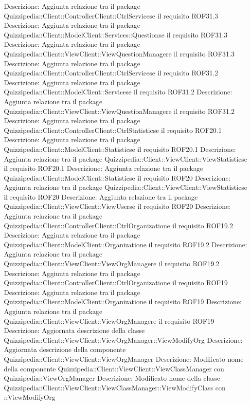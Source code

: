 Descrizione: Aggiunta relazione tra il package Quizzipedia::Client::ControllerClient::CtrlServicese il requisito ROF31.3 
Descrizione: Aggiunta relazione tra il package Quizzipedia::Client::ModelClient::Services::Questionse il requisito ROF31.3 
Descrizione: Aggiunta relazione tra il package Quizzipedia::Client::ViewClient::ViewQuestionManagere il requisito ROF31.3 
Descrizione: Aggiunta relazione tra il package Quizzipedia::Client::ControllerClient::CtrlServicese il requisito ROF31.2 
Descrizione: Aggiunta relazione tra il package Quizzipedia::Client::ModelClient::Servicese il requisito ROF31.2 
Descrizione: Aggiunta relazione tra il package Quizzipedia::Client::ViewClient::ViewQuestionManagere il requisito ROF31.2 
Descrizione: Aggiunta relazione tra il package Quizzipedia::Client::ControllerClient::CtrlStatisticse il requisito ROF20.1 
Descrizione: Aggiunta relazione tra il package Quizzipedia::Client::ModelClient::Statisticse il requisito ROF20.1 
Descrizione: Aggiunta relazione tra il package Quizzipedia::Client::ViewClient::ViewStatisticse il requisito ROF20.1 
Descrizione: Aggiunta relazione tra il package Quizzipedia::Client::ModelClient::Statisticse il requisito ROF20 
Descrizione: Aggiunta relazione tra il package Quizzipedia::Client::ViewClient::ViewStatisticse il requisito ROF20 
Descrizione: Aggiunta relazione tra il package Quizzipedia::Client::ViewClient::ViewUserse il requisito ROF20 
Descrizione: Aggiunta relazione tra il package Quizzipedia::Client::ControllerClient::CtrlOrganizatione il requisito ROF19.2 
Descrizione: Aggiunta relazione tra il package Quizzipedia::Client::ModelClient::Organizatione il requisito ROF19.2 
Descrizione: Aggiunta relazione tra il package Quizzipedia::Client::ViewClient::ViewOrgManagere il requisito ROF19.2 
Descrizione: Aggiunta relazione tra il package Quizzipedia::Client::ControllerClient::CtrlOrganizatione il requisito ROF19 
Descrizione: Aggiunta relazione tra il package Quizzipedia::Client::ModelClient::Organizatione il requisito ROF19 
Descrizione: Aggiunta relazione tra il package Quizzipedia::Client::ViewClient::ViewOrgManagere il requisito ROF19 
Descrizione: Aggiornata descrizione della classe Quizzipedia::Client::ViewClient::ViewOrgManager::ViewModifyOrg 
Descrizione: Aggiornata descrizione della componente Quizzipedia::Client::ViewClient::ViewOrgManager 
Descrizione: Modificato nome della componente Quizzipedia::Client::ViewClient::ViewClassManager con Quizzipedia::ViewOrgManager 
Descrizione: Modificato nome della classe Quizzipedia::Client::ViewClient::ViewClassManager::ViewModifyClass con ::ViewModifyOrg 
